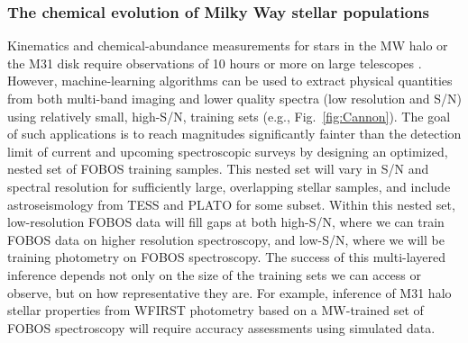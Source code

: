 \subsubsection{The chemical evolution of Milky Way stellar
populations} Kinematics and chemical-abundance measurements for stars
in the MW halo or the M31 disk require observations of 10 hours or
more on large telescopes \citep[e.g.,][]{2018arXiv180904082C}.
However, machine-learning algorithms can be used to extract physical
quantities from both multi-band imaging and lower quality spectra
(low resolution and S/N) using relatively small, high-S/N, training
sets (e.g., Fig.~\ref{fig:Cannon}). The goal of such applications is
to reach magnitudes significantly fainter than the detection limit of
current and upcoming spectroscopic surveys by designing an optimized,
nested set of FOBOS training samples. This nested set will vary in
S/N and spectral resolution for sufficiently large, overlapping
stellar samples, and include astroseismology from TESS and PLATO for
some subset. Within this nested set, low-resolution FOBOS data will
fill gaps at both high-S/N, where we can train FOBOS data on
higher resolution spectroscopy, and low-S/N, where we will
be training photometry on FOBOS spectroscopy. The success of this
multi-layered inference depends not only on the size of the training
sets we can access or observe, but on how representative they are.
For example, inference of M31 halo stellar properties from WFIRST
photometry based on a MW-trained set of FOBOS spectroscopy will
require accuracy assessments using simulated data.




